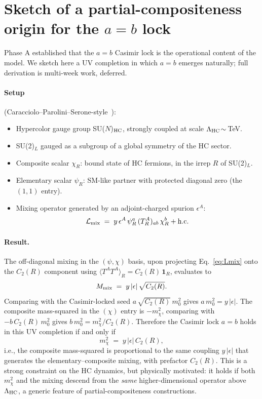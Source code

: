 \documentclass[11pt,a4paper]{article}
\newcommand{\Cas}{C_2}
\begin{document}
\section{Sketch of a partial-compositeness origin for the $a = b$ lock}
\label{sec:PCsketch}

Phase A established that the $a = b$ Casimir lock is the operational
content of the model. We sketch here a UV completion in which $a = b$
emerges naturally; full derivation is multi-week work, deferred.

\paragraph{Setup} (Caracciolo--Parolini--Serone-style~\cite{Caracciolo2012}):
\begin{itemize}
\item Hypercolor gauge group SU($N$)$_{\rm HC}$, strongly coupled at
  scale $\Lambda_{\rm HC}\!\sim\!$ TeV.
\item SU(2)$_L$ gauged as a subgroup of a global symmetry of the HC sector.
\item Composite scalar $\chi_R$: bound state of HC fermions, in the
  irrep $R$ of SU(2)$_L$.
\item Elementary scalar $\psi_R$: SM-like partner with protected
  diagonal zero (the $(1,1)$ entry).
\item Mixing operator generated by an adjoint-charged spurion
  $\epsilon^A$:
  \begin{equation}
    \mathcal L_{\rm mix} \;=\; y\,\epsilon^A\,\psi_R^a\,(T_R^A)_{ab}\,\chi_R^b + \text{h.c.}
  \label{eq:Lmix}
  \end{equation}
\end{itemize}

\paragraph{Result.} The off-diagonal mixing in the $(\psi, \chi)$ basis,
upon projecting Eq.~\eqref{eq:Lmix} onto the $\Cas(R)$ component using
$\langle T^A T^A\rangle_R = \Cas(R)\,\mathbf{1}_R$, evaluates to
\begin{equation}
  M_{\rm mix} \;=\; y\,|\epsilon|\,\sqrt{\Cas(R)}.
\end{equation}
Comparing with the Casimir-locked seed $a\,\sqrt{\Cas(R)}\,m_0^2$ gives
$a\,m_0^2 = y\,|\epsilon|$. The composite mass-squared in the
$(\chi)$ entry is $-m_\chi^2$, comparing with $-b\,\Cas(R)\,m_0^2$ gives
$b\,m_0^2 = m_\chi^2 / \Cas(R)$. Therefore the Casimir lock $a = b$
holds in this UV completion if and only if
\begin{equation}
  m_\chi^2 \;=\; y\,|\epsilon|\,\Cas(R),
\label{eq:ab_condition}
\end{equation}
i.e., the composite mass-squared is proportional to the same coupling
$y\,|\epsilon|$ that generates the elementary--composite mixing, with
prefactor $\Cas(R)$. This is a strong constraint on the HC dynamics, but
physically motivated: it holds if both $m_\chi^2$ and the mixing
descend from the \emph{same} higher-dimensional operator above
$\Lambda_{\rm HC}$, a generic feature of partial-compositeness
constructions.
\end{document}
